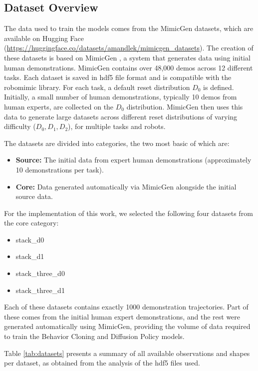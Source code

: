 \documentclass[11pt,a4paper]{article}
\begin{document}
\subsection{Dataset Overview}

The data used to train the models comes from the MimicGen datasets, which are available on Hugging Face (\url{https://huggingface.co/datasets/amandlek/mimicgen_datasets}). The creation of these datasets is based on MimicGen \cite{mandlekar2023mimicgen}, a system that generates data using initial human demonstrations.
MimicGen contains over 48,000 demos across 12 different tasks. Each dataset is saved in hdf5 file format and is compatible with the robomimic library.
For each task, a default reset distribution $D_0$ is defined. Initially, a small number of human demonstrations, typically 10 demos from human experts, are collected on the $D_0$ distribution. MimicGen then uses this data to generate large datasets across different reset distributions of varying difficulty ($D_0, D_1, D_2$), for multiple tasks and robots.

The datasets are divided into categories, the two most basic of which are:
\begin{itemize}
    \item \textbf{Source:} The initial data from expert human demonstrations (approximately 10 demonstrations per task).
    \item \textbf{Core:} Data generated automatically via MimicGen alongside the initial source data.
\end{itemize}

For the implementation of this work, we selected the following four datasets from the core category:
\begin{itemize}
    \item stack\_d0
    \item stack\_d1
    \item stack\_three\_d0
    \item stack\_three\_d1
\end{itemize}

Each of these datasets contains exactly 1000 demonstration trajectories. Part of these comes from the initial human expert demonstrations, and the rest were generated automatically using MimicGen, providing the volume of data required to train the Behavior Cloning and Diffusion Policy models.

Table \ref{tab:datasets} presents a summary of all available observations and shapes per dataset, as obtained from the analysis of the hdf5 files used.
\end{document}
